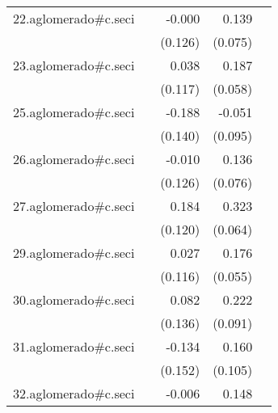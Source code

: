 {\begin{longtable}{l*{4}{D{.}{.}{-1}}}
\addlinespace
22.aglomerado#c.seci&                     &      -0.000         &       0.139         &                     \\
            &                     &     (0.126)         &     (0.075)         &                     \\
\addlinespace
23.aglomerado#c.seci&                     &       0.038         &       0.187\sym{**} &                     \\
            &                     &     (0.117)         &     (0.058)         &                     \\
\addlinespace
25.aglomerado#c.seci&                     &      -0.188         &      -0.051         &                     \\
            &                     &     (0.140)         &     (0.095)         &                     \\
\addlinespace
26.aglomerado#c.seci&                     &      -0.010         &       0.136         &                     \\
            &                     &     (0.126)         &     (0.076)         &                     \\
\addlinespace
27.aglomerado#c.seci&                     &       0.184         &       0.323\sym{***}&                     \\
            &                     &     (0.120)         &     (0.064)         &                     \\
\addlinespace
29.aglomerado#c.seci&                     &       0.027         &       0.176\sym{**} &                     \\
            &                     &     (0.116)         &     (0.055)         &                     \\
\addlinespace
30.aglomerado#c.seci&                     &       0.082         &       0.222\sym{*}  &                     \\
            &                     &     (0.136)         &     (0.091)         &                     \\
\addlinespace
31.aglomerado#c.seci&                     &      -0.134         &       0.160         &                     \\
            &                     &     (0.152)         &     (0.105)         &                     \\
\addlinespace
32.aglomerado#c.seci&                     &      -0.006         &       0.148         &                     \\

\end{longtable}}
